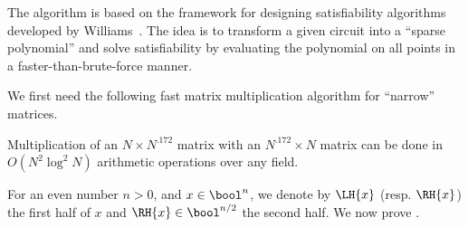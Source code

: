 	The algorithm is based on the framework for designing satisfiability algorithms developed by Williams~\cite{Wil14}. The idea is to transform a given circuit into a ``sparse polynomial'' and solve satisfiability by evaluating the polynomial on all points in a faster-than-brute-force manner.
	
	We first need the following fast matrix multiplication algorithm for ``narrow'' matrices.
	
	\begin{theorem}\label{thm:sat-fast-matrix-mul}
		Multiplication of an $N\times N^{.172}$ matrix with an $N^{.172}\times N$ matrix can be done in $O(N^2 \log^2 N)$ arithmetic operations over any field.
	\end{theorem}

	For an even number $n>0$, and $x\in\bool^{n}$, we denote by $\LH{x}$ (resp. $\RH{x}$) the first half of $x$ and $\RH{x}\in\bool^{n/2}$ the second half. We now prove .
	
